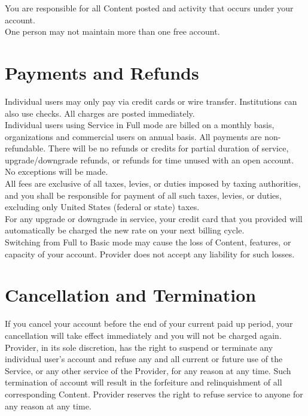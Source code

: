 \documentclass{article}
\begin{document}
\noindent
You are responsible for all Content posted and activity that occurs under your account.\\

\noindent
One person may not maintain more than one free account.\\

\section*{Payments and Refunds} 

Individual users may only pay via credit cards or wire transfer. Institutions can also use checks. All charges are posted immediately.\\

\noindent
Individual users using Service in Full mode are billed on a monthly basis, organizations and commercial users on annual basis. All payments are non-refundable. There will be no refunds or credits for partial duration of service, upgrade/downgrade refunds, or refunds for time unused with an open account. No exceptions will be made.\\

\noindent
All fees are exclusive of all taxes, levies, or duties imposed by taxing authorities, and you shall be responsible for payment of all such taxes, levies, or duties, excluding only United States (federal or state) taxes.\\

\noindent
For any upgrade or downgrade in service, your credit card that you provided will automatically 
be charged the new rate on your next billing cycle.\\

\noindent
Switching from Full to Basic mode may cause the loss of Content, features, or capacity of your account. Provider does not accept any liability for such losses.\\


\section{Cancellation and Termination}

If you cancel your account before the end of your current paid up period, your cancellation will take effect immediately and you will not be charged again.\\

\noindent
Provider, in its sole discretion, has the right to suspend or terminate any individual user’s account and refuse any and all current or future use of the Service, or any other service of the Provider, for any reason at any time. Such termination of account will result in the forfeiture and relinquishment of all corresponding Content. Provider reserves the right to refuse service to anyone for any reason at any time.\\
\end{document}
